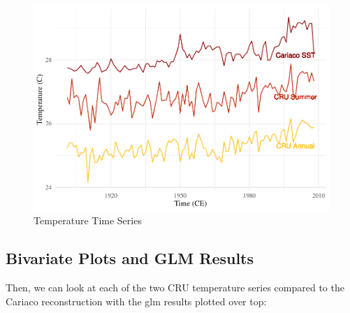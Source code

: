 \documentclass[]{article}
\begin{document}
\begin{figure}
\centering
\includegraphics{cru_data_files/figure-latex/unnamed-chunk-9-1.pdf}
\caption{Temperature Time Series}
\end{figure}

\subsection{Bivariate Plots and GLM
Results}\label{bivariate-plots-and-glm-results}

Then, we can look at each of the two CRU temperature series compared to
the Cariaco reconstruction with the glm results plotted over top:
\end{document}
